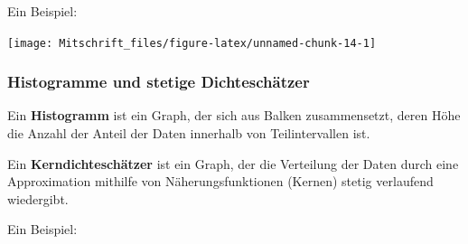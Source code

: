 \documentclass[
]{article}
\newenvironment{Shaded}{\begin{snugshade}}{\end{snugshade}}
\newcommand{\AttributeTok}[1]{\textcolor[rgb]{0.13,0.29,0.53}{#1}}
\newcommand{\ConstantTok}[1]{\textcolor[rgb]{0.56,0.35,0.01}{#1}}
\newcommand{\FloatTok}[1]{\textcolor[rgb]{0.00,0.00,0.81}{#1}}
\newcommand{\FunctionTok}[1]{\textcolor[rgb]{0.13,0.29,0.53}{\textbf{#1}}}
\newcommand{\NormalTok}[1]{#1}
\newcommand{\OtherTok}[1]{\textcolor[rgb]{0.56,0.35,0.01}{#1}}
\newcommand{\SpecialCharTok}[1]{\textcolor[rgb]{0.81,0.36,0.00}{\textbf{#1}}}
\newcommand{\StringTok}[1]{\textcolor[rgb]{0.31,0.60,0.02}{#1}}
\begin{document}
Ein Beispiel:

\begin{Shaded}
\end{Shaded}

\begin{center}\texttt{[image: Mitschrift\_files/figure-latex/unnamed-chunk-14-1]} \end{center}
\endtcolorbox

\hypertarget{histogramme-und-stetige-dichteschuxe4tzer}{%
\subsubsection{Histogramme und stetige
Dichteschätzer}\label{histogramme-und-stetige-dichteschuxe4tzer}}

\tcolorbox

Ein \textbf{Histogramm} ist ein Graph, der sich aus Balken
zusammensetzt, deren Höhe die Anzahl der Anteil der Daten innerhalb von
Teilintervallen ist.

\vspace{2mm}

Ein \textbf{Kerndichteschätzer} ist ein Graph, der die Verteilung der
Daten durch eine Approximation mithilfe von Näherungsfunktionen (Kernen)
stetig verlaufend wiedergibt.

Ein Beispiel:

\begin{Shaded}
\end{Shaded}
\end{document}
